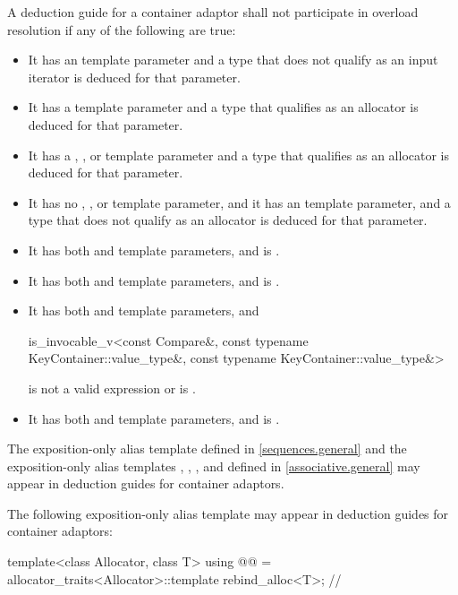 \pnum
A deduction guide for a container adaptor shall not participate in overload resolution if any of the following are true:
\begin{itemize}
\item It has an  template parameter and a type that does not qualify as an input iterator is deduced for that parameter.
\item It has a  template parameter and a type that qualifies as an allocator is deduced for that parameter.
\item It has a , , or  template parameter and a type that qualifies as an allocator is deduced for that parameter.
\item It has no , , or  template parameter, and it has an  template parameter, and a type that does not qualify as an allocator is deduced for that parameter.
\item It has both  and  template parameters, and  is .
\item It has both  and  template parameters, and
 is .
\item It has both  and  template parameters, and
\begin{codeblock}
is_invocable_v<const Compare&,
               const typename KeyContainer::value_type&,
               const typename KeyContainer::value_type&>
\end{codeblock}
is not a valid expression or is .
\item It has both  and  template parameters, and
 is .
\end{itemize}

\pnum
The exposition-only alias template 
defined in \ref{sequences.general} and
the exposition-only alias templates , ,
, and 
defined in \ref{associative.general}
may appear in deduction guides for container adaptors.

\pnum
The following exposition-only alias template
may appear in deduction guides for container adaptors:
\begin{codeblock}
template<class Allocator, class T>
  using @@ = allocator_traits<Allocator>::template rebind_alloc<T>;   // \expos
\end{codeblock}

